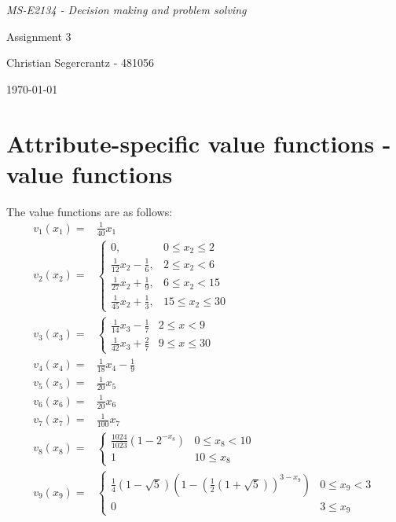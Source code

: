 \documentclass{article}
\begin{document}
	\textit{MS-E2134 - Decision making and problem solving}
	\vfill
	{\centering \Huge Assignment 3 \par}
	\vfill
	Christian Segercrantz - 481056 \\
	\par \today
	\pagebreak
	\tableofcontents
	\pagebreak
\section{Attribute-specific value functions - value functions}
The value functions are as follows:
\begin{align}
	v_1(x_1) =& \frac{1}{40}x_1 \\
	v_2(x_2) =& 
		\begin{cases}
		 0,& 0 \leq x_2 \leq 2 \\
		 \frac{1}{12}x_2 -\frac{1}{6},& 2 \leq x_2 < 6 \\
		 \frac{1}{27}x_2 +\frac{1}{9},& 6 \leq x_2 < 15 \\
		 \frac{1}{45}x_2 +\frac{1}{3},& 15 \leq x_2 \leq 30
		\end{cases}\\
	v_3(x_3) =&
		\begin{cases}
			\frac{1}{14}x_3 - \frac{1}{7} & 2 \leq x <9\\
			\frac{1}{42}x_3 + \frac{2}{7} & 9 \leq x \leq 30
		\end{cases} \\
	v_4(x_4) =& \frac{1}{18}x_4 - \frac{1}{9}\\ 
	v_5(x_5) =& \frac{1}{20}x_5\\
	v_6(x_6) =& \frac{1}{20}x_6\\
	v_7(x_7) =& \frac{1}{100}x_7\\
	v_8(x_8) =& 
		\begin{cases}
			\frac{1024}{1023}\left(1-2^{-x_8}\right) & 0 \leq x_8 < 10 \\
			1 &  10 \leq x_8
		\end{cases} \\
	v_9(x_9) =&
		\begin{cases}
			 \frac{1}{4}(1-\sqrt{5})\left(1-\left(\frac{1}{2}\left(1+\sqrt{5}\right)\right)^{3-x_9}\right) & 0 \leq x_9 < 3 \\
			 0 & 3 \leq x_9
		\end{cases}
\end{align}
\end{document}
